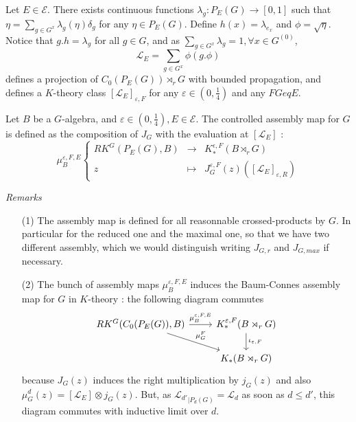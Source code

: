 Let $E\in\mathcal E$. There exists continuous functions $\lambda_g : P_E(G)\rightarrow [0,1]$ such that $\eta = \sum_{g\in G^x}\lambda_g(\eta) \delta_g$ for any $\eta\in P_E(G)$. Define $h(x)=\lambda_{e_x}$ and $\phi = \sqrt\eta$. Notice that $g.h = \lambda_g$ for all $g\in G$, and as $\sum_{g\in G^x}\lambda_g = 1 ,\forall x\in G^{(0)}$, 
\[\mathcal L_E =\sum_{g\in G^x} \phi(g.\phi)\]
defines a projection of $C_0(P_E(G))\rtimes_r G$ with bounded propagation, and defines a $K$-theory class $[\mathcal L_E]_{\varepsilon,F}$ for any $\varepsilon\in (0,\frac{1}{4})$ and any $FGeq E$.\\

\begin{definition}
Let $B$ be a $G$-algebra, and $\varepsilon\in (0,\frac{1}{4}),E\in\mathcal E$. The controlled assembly map for $G$ is defined as the composition of $J_G$ with the evaluation at $[\mathcal L_E]$ :
\[\mu_B^{\varepsilon,F,E}\left\{
\begin{array}{rcl}
RK^G(P_E(G), B) & \rightarrow & K_*^{\epsilon, F}(B\rtimes_r G)\\
z & \mapsto & J_G^{\varepsilon, F}(z)([\mathcal L_E]_{\varepsilon , R})
\end{array}\right.\]
\end{definition}



\textit{Remarks}
\begin{itemize}
\item[(1)] The assembly map is defined for all reasonnable crossed-products by $G$. In particular for the reduced one and the maximal one, so that we have two different assembly, which we would distinguish writing $J_{G,r}$ and $J_{G,max}$ if necessary.
\item[(2)] The bunch of assembly maps $\mu_B^{\varepsilon,F,E}$ induces the Baum-Connes assembly map for $G$ in $K$-theory : the following diagram commutes
\[\begin{tikzcd}
RK^G(C_0(P_E(G)),B) \arrow{r}{\mu_B^{\varepsilon,F,E}}\arrow{dr}{\mu_G^F} & K_*^{\varepsilon, F}(B\rtimes_r G)\arrow{d}{\iota_{\varepsilon,F}}\\ 
		&  K_*(B\rtimes_r G)
\end{tikzcd}\]
because $J_G(z)$ induces the right multiplication by $j_G(z)$ and also $\mu_G^d(z)=[\mathcal L_E]\otimes j_G(z)$. But, as ${{\mathcal L}_{d'}}_{|P_d(G)}=\mathcal L_d$ as soon as $d\leq d'$, this diagram commutes with inductive limit over $d$.\\
\end{itemize}

